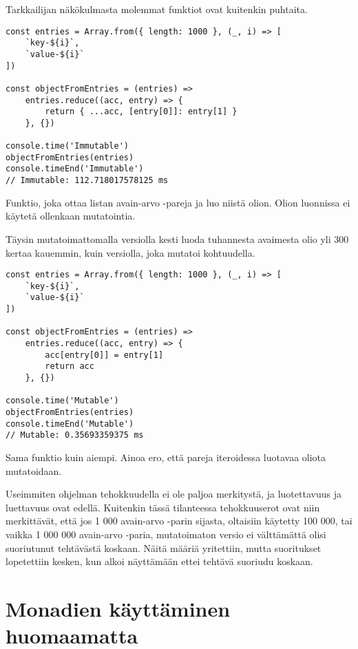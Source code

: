 Tarkkailijan näkökulmasta molemmat funktiot ovat kuitenkin puhtaita.

\begin{code}
    \begin{verbatim}
const entries = Array.from({ length: 1000 }, (_, i) => [
    `key-${i}`,
    `value-${i}`
])

const objectFromEntries = (entries) =>
    entries.reduce((acc, entry) => {
        return { ...acc, [entry[0]]: entry[1] }
    }, {})

console.time('Immutable')
objectFromEntries(entries)
console.timeEnd('Immutable')
// Immutable: 112.718017578125 ms
\end{verbatim}
    \caption{Funktio, joka ottaa listan avain-arvo -pareja ja luo niistä olion. Olion luonnissa ei käytetä ollenkaan mutatointia.}
    \label{code:js_just_mutate_immutable}
\end{code}

Täysin mutatoimattomalla versiolla kesti luoda tuhannesta avaimesta olio yli 300 kertaa kauemmin, kuin versiolla, joka mutatoi kohtuudella.


\begin{code}
    \begin{verbatim}
const entries = Array.from({ length: 1000 }, (_, i) => [
    `key-${i}`,
    `value-${i}`
])

const objectFromEntries = (entries) =>
    entries.reduce((acc, entry) => {
        acc[entry[0]] = entry[1]
        return acc
    }, {})
          
console.time('Mutable')
objectFromEntries(entries)
console.timeEnd('Mutable')
// Mutable: 0.35693359375 ms
\end{verbatim}
    \caption{Sama funktio kuin aiempi. Ainoa ero, että pareja iteroidessa luotavaa oliota mutatoidaan.}
    \label{code:js_just_mutate_mutable}
\end{code}

Useimmiten ohjelman tehokkuudella ei ole paljoa merkitystä, ja luotettavuus ja luettavuus ovat edellä. Kuitenkin tässä tilanteessa tehokkuuserot ovat niin merkittävät, että jos 1 000 avain-arvo -parin sijasta, oltaisiin käytetty 100 000, tai vaikka 1 000 000 avain-arvo -paria, mutatoimaton versio ei välttämättä olisi suoriutunut tehtävästä koskaan. Näitä määriä yritettiin, mutta suoritukset lopetettiin kesken, kun alkoi näyttämään ettei tehtävä suoriudu koskaan.


\section{Monadien käyttäminen huomaamatta}


